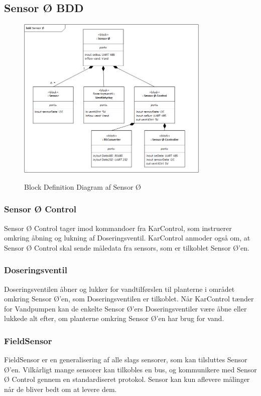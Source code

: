 
\subsection{Sensor Ø BDD}

\begin{figure}[H]
	\centering
	\includegraphics[width=0.82\textwidth]{Systemarkitektur/Sensoroe/Sensoroe_BDD.png}
	\label{fig:Sensoroe BDD}
	\caption{Block Definition Diagram af Sensor Ø}
\end{figure}

\subsubsection*{Sensor Ø Control}
Sensor Ø Control tager imod kommandoer fra KarControl, som instruerer omkring åbning og lukning af Doseringsventil. KarControl anmoder også om, at Sensor Ø Control skal sende måledata fra sensors, som er tilkoblet Sensor Ø’en.

\subsubsection{Doseringsventil}
Doseringsventilen åbner og lukker for vandtilførslen til planterne i området omkring Sensor Ø’en, som Doseringsventilen er tilkoblet. Når KarControl tænder for Vandpumpen kan de enkelte Sensor Ø’ers Doseringsventiler være åbne eller lukkede alt efter, om planterne omkring Sensor Ø’en har brug for vand.

\subsubsection{FieldSensor}
FieldSensor er en generalisering af alle slags sensorer, som kan tilsluttes Sensor Ø’en. Vilkårligt mange sensorer kan tilkobles en bus, og kommunikere med Sensor Ø Control gennem en standardiseret protokol. Sensor kan kun aflevere målinger når de bliver bedt om at levere dem.

